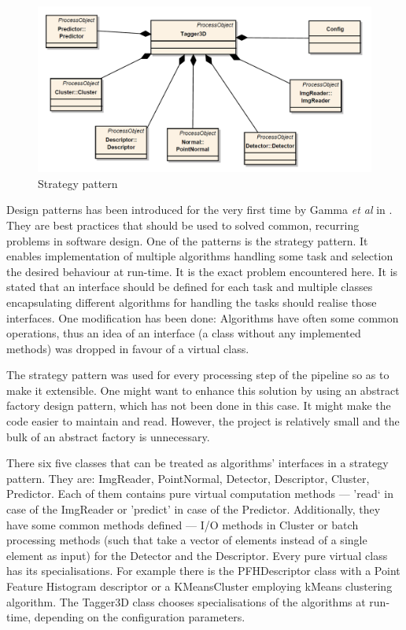 	\begin{figure}[ht]
	\centering
	\includegraphics[width=1.0\textwidth]{figs/short}
	\caption{Strategy pattern}
	\label{fig:strategy}
	\end{figure}
	
	Design patterns has been introduced for the very first time by Gamma \emph{et al} in \cite{gamma1993design}. They are best practices that should be used to solved common, recurring problems in software design. One of the patterns is the strategy pattern. It enables implementation of multiple algorithms handling some task and selection the desired behaviour at run-time. It is the exact problem encountered here. It is stated that an interface should be defined for each task and multiple classes encapsulating different algorithms for handling the tasks should realise those interfaces. One modification has been done: Algorithms have often some common operations, thus an idea of an interface (a class without any implemented methods) was dropped in favour of a virtual class. 
	
	The strategy pattern was used for every processing step of the pipeline so as to make it extensible. One might want to enhance this solution by using an abstract factory design pattern, which has not been done in this case. It might make the code easier to maintain and read. However, the project is relatively small and the bulk of an abstract factory is unnecessary.
	
	There six five classes that can be treated as algorithms' interfaces in a strategy pattern. They are: ImgReader, PointNormal, Detector, Descriptor, Cluster, Predictor. Each of them contains pure virtual computation methods --- 'read` in case of the ImgReader or 'predict' in case of the Predictor. Additionally, they have some common methods defined --- I/O methods in Cluster or batch processing methods (such that take a vector of elements instead of a single element as input) for the Detector and the Descriptor. Every pure virtual class has its specialisations. For example there is the PFHDescriptor class with a Point Feature Histogram descriptor or a KMeansCluster employing kMeans clustering algorithm. The Tagger3D class chooses specialisations of the algorithms at run-time, depending on the configuration parameters.
	
	